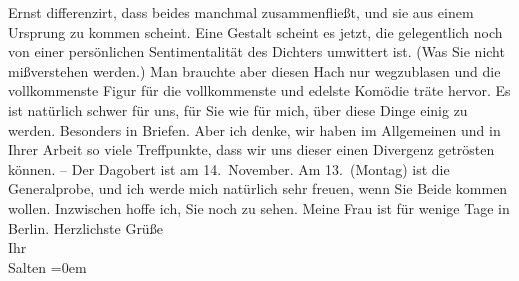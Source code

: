\begin{ledgroupsized}[t]{13cm}
               Ernst differenzirt, dass beides manchmal zusammenfließt, und sie aus einem Ursprung
               zu kommen scheint. Eine Gestalt scheint es jetzt, die gelegentlich noch von einer
               persönlichen Sentimentalität des Dichters umwittert ist. (Was Sie nicht mißverstehen
               werden.) Man brauchte aber diesen Hach nur wegzublasen und die vollkommenste Figur
               für die vollkommenste und edelste Komödie träte hervor.\pend
           \pstart
           Es ist natürlich schwer für uns, für Sie wie für mich, über diese Dinge einig zu
               werden. Besonders in Briefen. Aber ich denke, wir haben im Allgemeinen und in Ihrer
               Arbeit so viele Treffpunkte, dass wir uns dieser einen Divergenz getrösten können. –
               Der Dagobert ist am 14. November. Am 13. (Montag) ist die
               Generalprobe, und ich werde mich natürlich sehr freuen, wenn Sie Beide kommen wollen. Inzwischen hoffe ich,
               Sie noch zu sehen. Meine Frau ist für wenige Tage in Berlin.\pend
           \pstart
           Herzlichste Grüße {\\[\baselineskip]}Ihr {\\[\baselineskip]}\spacefill\mbox{Salten}\pend
           \leftskip=0em{}
         
         \endnumbering{}\end{ledgroupsized}  \newcommand{\dateiname}{L03554}\newcommand{\titel}{Felix Salten an Arthur Schnitzler, 22. 10. 1911}\newcommand{\editorInnen}{Martin Anton Müller und Laura Untner}
      